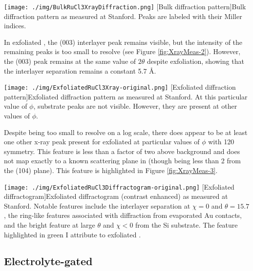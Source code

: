 \begin{centering}
\texttt{[image: ./img/BulkRuCl3XrayDiffraction.png]}
  \captionsetup{width=0.75\textwidth}
  [Bulk \rucl diffraction pattern]{Bulk \rucl diffraction pattern as measured at Stanford. Peaks are labeled with their Miller indices.} 
  \label{fig:XrayMeas-1}
\end{centering}

In exfoliated \ruclnospace , the (003) interlayer peak remains visible, but the intensity of the remaining peaks is too small to resolve (see Figure \ref{fig:XrayMeas-2}). However, the (003) peak remains at the same value of $2\theta$ despite exfoliation, showing that the interlayer separation remains a constant 5.7 \AA .

\begin{centering}
\texttt{[image: ./img/ExfoliatedRuCl3Xray-original.png]}
  \captionsetup{width=0.75\textwidth}
  [Exfoliated \rucl diffraction pattern]{Exfoliated \rucl diffraction pattern as measured at Stanford. At this particular value of $\phi$, substrate peaks are not visible. However, they are present at other values of $\phi$.} 
  \label{fig:XrayMeas-2}
\end{centering}

Despite being too small to resolve on a log scale, there does appear to be at least one other x-ray peak present for exfoliated \rucl at particular values of $\phi$ with 120\degree{} symmetry. This feature is less than a factor of two above background and does not map exactly to a known scattering plane in \rucl (though being less than 2\degree{} from the (104) plane). This feature is highlighted in Figure \ref{fig:XrayMeas-3}.

\begin{centering}
\texttt{[image: ./img/ExfoliatedRuCl3Diffractogram-original.png]}
  \captionsetup{width=0.75\textwidth}
  [Exfoliated \rucl diffractogram]{Exfoliated \rucl diffractogram (contrast enhanced) as measured at Stanford. Notable features include the \rucl interlayer separation at $\chi = 0$ and $\theta = 15.7$\degree, the ring-like features associated with diffraction from evaporated Au contacts, and the bright feature at large $\theta$ and $\chi < 0$ from the Si substrate. The feature highlighted in green I attribute to exfoliated \ruclnospace .} 
  \label{fig:XrayMeas-3}
\end{centering}

\subsection{Electrolyte-gated \rucl}

